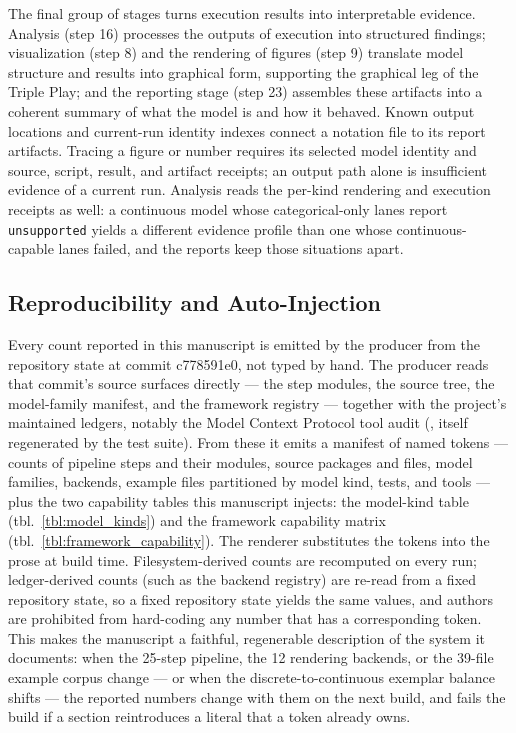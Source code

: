 \documentclass[
  english,
  9pt,
]{extarticle}
\begin{document}
The final group of stages turns execution results into interpretable
evidence. Analysis (step 16) processes the outputs of execution into
structured findings; visualization (step 8) and the rendering of figures
(step 9) translate model structure and results into graphical form,
supporting the graphical leg of the Triple Play; and the reporting stage
(step 23) assembles these artifacts into a coherent summary of what the
model is and how it behaved. Known output locations and current-run
identity indexes connect a notation file to its report artifacts.
Tracing a figure or number requires its selected model identity and
source, script, result, and artifact receipts; an output path alone is
insufficient evidence of a current run. Analysis reads the per-kind
rendering and execution receipts as well: a continuous model whose
categorical-only lanes report \texttt{unsupported} yields a different
evidence profile than one whose continuous-capable lanes failed, and the
reports keep those situations apart.

\subsection{Reproducibility and
Auto-Injection}\label{reproducibility-and-auto-injection}

Every count reported in this manuscript is emitted by the producer
 from the
repository state at commit c778591e0, not typed by hand. The producer
reads that commit's source surfaces directly --- the step modules, the
source tree, the model-family manifest, and the framework registry ---
together with the project's maintained ledgers, notably the Model
Context Protocol tool audit (,
itself regenerated by the test suite). From these it emits a manifest of
named tokens --- counts of pipeline steps and their modules, source
packages and files, model families, backends, example files partitioned
by model kind, tests, and tools --- plus the two capability tables this
manuscript injects: the model-kind table (tbl.~\ref{tbl:model_kinds})
and the framework capability matrix
(tbl.~\ref{tbl:framework_capability}). The renderer substitutes the
tokens into the prose at build time. Filesystem-derived counts are
recomputed on every run; ledger-derived counts (such as the backend
registry) are re-read from a fixed repository state, so a fixed
repository state yields the same values, and authors are prohibited from
hard-coding any number that has a corresponding token. This makes the
manuscript a faithful, regenerable description of the system it
documents: when the 25-step pipeline, the 12 rendering backends, or the
39-file example corpus change --- or when the discrete-to-continuous
exemplar balance shifts --- the reported numbers change with them on the
next build, and  fails the
build if a section reintroduces a literal that a token already owns.
\end{document}
